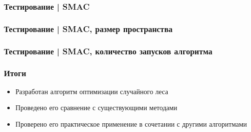 \documentclass{beamer}
\begin{document}
\begin{frame} \frametitle{Тестирование | SMAC}
    \begin{center}
        
    \end{center}
\end{frame}

\begin{frame} \frametitle{Тестирование | SMAC, размер пространства}
    \begin{center}
        
    \end{center}
\end{frame}

\begin{frame} \frametitle{Тестирование | SMAC, количество запусков алгоритма}
    \begin{center}
        
    \end{center}
\end{frame}

\begin{frame} \frametitle{Итоги}
    \begin{itemize}
        \item Разработан алгоритм оптимизации случайного леса
        \item Проведено его сравнение с существующими методами
        \item Проверено его практическое применение в сочетании с другими алгоритмами
    \end{itemize}
\end{frame}
\end{document}
